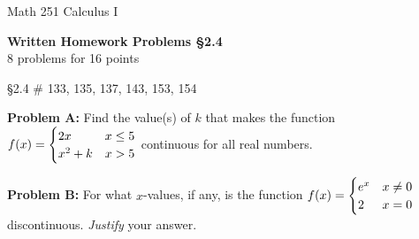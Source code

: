 \documentclass[11pt]{report}
\theoremstyle{plain}
\begin{document}
\hfill Math 251 Calculus I
\begin{center}
\Large{\textbf{Written Homework Problems \S 2.4}} \\
8 problems for 16 points\\
\end{center}

\begin{description}
\item{\S 2.4} \# 133, 135, 137, 143, 153, 154
\item{\textbf{Problem A:}} Find the value(s) of $k$ that makes the function $f(x)= \begin{cases} 2x & x \leq 5 \cr x^2+k &x>5 \end{cases}$ continuous for all real numbers.

\item{\textbf{Problem B:}} For what $x$-values, if any, is the function $f(x)= \begin{cases} e^x & x \not = 0 \cr 2 &x=0 \end{cases}$ discontinuous. \emph{Justify} your answer.
\end{description}
\end{document}
